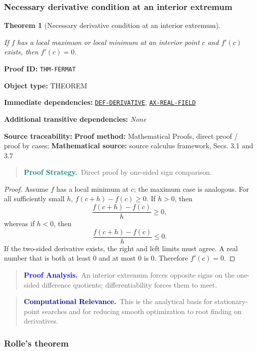 \documentclass[10pt]{article}
\newcommand{\pidraw}[1]{\begingroup\urlstyle{tt}\nolinkurl{#1}\endgroup}
\newcommand{\pidref}[1]{\hyperref[prf:#1]{\pidraw{#1}}}
\newtheorem{theorem}{Theorem}[section]
\theoremstyle{definition}
\theoremstyle{remark}
\newenvironment{proofstrategy}
{\begin{quote}\small\noindent\textbf{\textcolor{teal}{Proof Strategy.}}\ }
{\end{quote}}
\newenvironment{proofanalysis}
{\begin{quote}\small\noindent\textbf{\textcolor{blue}{Proof Analysis.}}\ }
{\end{quote}}
\newenvironment{computationalrelevance}
{\begin{quote}\small\noindent\textbf{\textcolor{navy}{Computational Relevance.}}\ }
{\end{quote}}
\newcommand{\meta}[2]{\noindent\textbf{#1:} #2\par}
\begin{document}
\subsubsection{Necessary derivative condition at an interior extremum}

\begin{theorem}[Necessary derivative condition at an interior extremum]\label{prf:THM-FERMAT}

If $f$ has a local maximum or local minimum at an interior point $c$ and $f'(c)$ exists, then $f'(c)=0$.

\end{theorem}

\meta{Proof ID}{\pidraw{THM-FERMAT}}
\meta{Object type}{THEOREM}
\meta{Immediate dependencies}{\pidref{DEF-DERIVATIVE}, \pidref{AX-REAL-FIELD}}
\meta{Additional transitive dependencies}{\emph{None}}
\meta{Source traceability}{\textbf{Proof method:} Mathematical Proofs, direct proof / proof by cases; \textbf{Mathematical source:} source calculus framework, Secs. 3.1 and 3.7}

\begin{proofstrategy}Direct proof by one-sided sign comparison.\end{proofstrategy}

\begin{proof}

Assume $f$ has a local minimum at $c$; the maximum case is analogous.
For all sufficiently small $h$,
$f(c+h)-f(c)\ge0$. If $h>0$, then
\[
\frac{f(c+h)-f(c)}{h}\ge0,
\]
whereas if $h<0$, then
\[
\frac{f(c+h)-f(c)}{h}\le0.
\]
If the two-sided derivative exists, the right and left limits must agree.
A real number that is both at least $0$ and at most $0$ is $0$.
Therefore $f'(c)=0$.

\end{proof}

\begin{proofanalysis}An interior extremum forces opposite signs on the one-sided difference quotients; differentiability forces them to meet.\end{proofanalysis}

\begin{computationalrelevance}This is the analytical basis for stationary-point searches and for reducing smooth optimization to root finding on derivatives.\end{computationalrelevance}

\subsubsection{Rolle's theorem}
\end{document}
